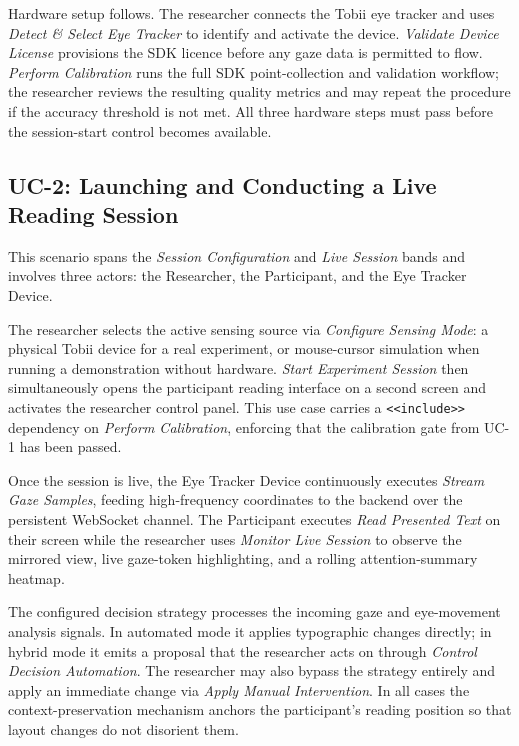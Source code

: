 Hardware setup follows.
The researcher connects the Tobii eye tracker and uses \textit{Detect \& Select
Eye Tracker} to identify and activate the device.
\textit{Validate Device License} provisions the SDK licence before any gaze data
is permitted to flow.
\textit{Perform Calibration} runs the full SDK point-collection and validation
workflow; the researcher reviews the resulting quality metrics and may repeat the
procedure if the accuracy threshold is not met.
All three hardware steps must pass before the session-start control becomes
available.

\subsection{UC-2: Launching and Conducting a Live Reading Session}
\label{sec:uc2}

This scenario spans the \textit{Session Configuration} and \textit{Live Session}
bands and involves three actors: the Researcher, the Participant, and the Eye
Tracker Device.

The researcher selects the active sensing source via \textit{Configure Sensing
Mode}: a physical Tobii device for a real experiment, or mouse-cursor simulation
when running a demonstration without hardware.
\textit{Start Experiment Session} then simultaneously opens the participant
reading interface on a second screen and activates the researcher control panel.
This use case carries a \texttt{<<include>>} dependency on \textit{Perform
Calibration}, enforcing that the calibration gate from UC-1 has been passed.

Once the session is live, the Eye Tracker Device continuously executes
\textit{Stream Gaze Samples}, feeding high-frequency coordinates to the backend
over the persistent WebSocket channel.
The Participant executes \textit{Read Presented Text} on their screen while the
researcher uses \textit{Monitor Live Session} to observe the mirrored view,
live gaze-token highlighting, and a rolling attention-summary heatmap.

The configured decision strategy processes the incoming gaze and eye-movement
analysis signals.
In automated mode it applies typographic changes directly; in hybrid mode it
emits a proposal that the researcher acts on through \textit{Control Decision
Automation}.
The researcher may also bypass the strategy entirely and apply an immediate change
via \textit{Apply Manual Intervention}.
In all cases the context-preservation mechanism anchors the participant's reading
position so that layout changes do not disorient them.

